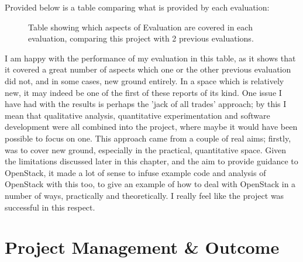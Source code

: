 Provided below is a table comparing what is provided by each evaluation:

\begin{figure}[H]
\centering
{}
\caption{Table showing which aspects of Evaluation are covered in each evaluation, comparing this project with 2 previous evaluations.}
\end{figure}

I am happy with the performance of my evaluation in this table, as it shows that it covered a great number of aspects which one or the other previous evaluation did not, and in some cases, new ground entirely. In a space which is relatively new, it may indeed be one of the first of these reports of its kind. One issue I have had with the results is perhaps the 'jack of all trades' approach; by this I mean that qualitative analysis, quantitative experimentation and software development were all combined into the project, where maybe it would have been possible to focus on one. This approach came from a couple of real aims; firstly, was to cover new ground, especially in the practical, quantitative space. Given the limitations discussed later in this chapter, and the aim to provide guidance to OpenStack, it made a lot of sense to infuse example code and analysis of OpenStack with this too, to give an example of how to deal with OpenStack in a number of ways, practically and theoretically. I really feel like the project was successful in this respect.  

\section{Project Management \& Outcome}
